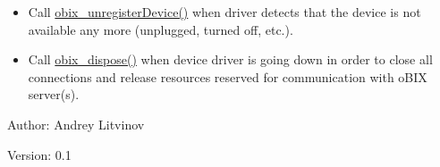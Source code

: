 \begin{itemize}
\item Call \hyperlink{obix__client_8c_9d339fe0e2d3c3daf42975e95747e703}{obix\_\-unregisterDevice()} when driver detects that the device is not available any more (unplugged, turned off, etc.).\end{itemize}
\begin{itemize}
\item Call \hyperlink{obix__client_8c_af779e0cf88cabf1986b7f519d427f41}{obix\_\-dispose()} when device driver is going down in order to close all connections and release resources reserved for communication with oBIX server(s).\end{itemize}
\begin{Desc}
\item[Author:]Andrey Litvinov \end{Desc}
\begin{Desc}
\item[Version:]0.1 \end{Desc}
